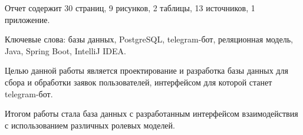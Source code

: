 
Отчет содержит 30 страниц, 9 рисунков, 2 таблицы, 13 источников, 1 приложение.

Ключевые слова: базы данных, PostgreSQL, telegram-бот, реляционная модель, Java, Spring Boot, IntelliJ IDEA.

Целью данной работы является проектирование и разработка базы данных для сбора и обработки заявок пользователей, интерфейсом для которой станет telegram-бот.

Итогом работы стала база данных с разработанным интерфейсом взаимодействия с использованием различных ролевых моделей.